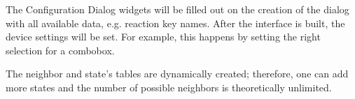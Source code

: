 The Configuration Dialog widgets will be filled out on the creation of the dialog with all available data, e.g. reaction key names. After the interface is built, the device settings will be set. For example, this happens by setting the right selection for a combobox.

The neighbor and state's tables are dynamically created; therefore, one can add more states and the number of possible neighbors is theoretically unlimited.


